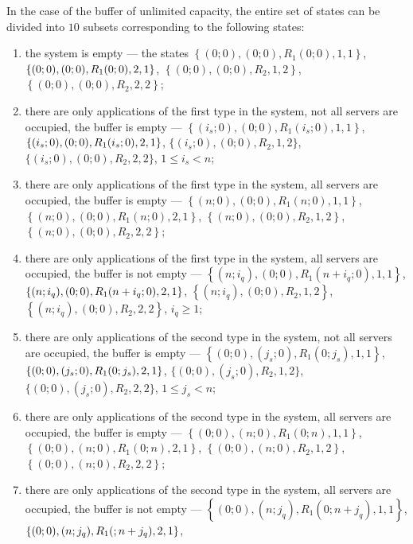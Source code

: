 {In the case of the buffer of unlimited capacity, the entire set of
states can be divided into $10$ subsets corresponding to the following
states:
\begin{enumerate}
\item the system is empty --- the
  states $\left\{(0; 0),(0; 0), R_1(0;0),1,1\right\}$,
  $\{(0; 0),(0; 0), R_1(0;0),\\* 2,1\}$,
  $\left\{(0; 0),(0; 0), R_2,1,2\right\}$,
  $\left\{(0; 0),(0; 0), R_2,2,2\right\}$;
\item there are only applications of the first type in the system, not
  all servers are occupied, the buffer is empty ---
  $\left\{(i_s; 0),(0; 0), R_1(i_s;0),1,1\right\}$,
  $\{(i_s; 0),(0; 0), R_1(i_s;0),\\* 2,1\}$,
  $\{(i_s; 0),(0; 0), R_2,1,2\}$, $\{(i_s; 0),(0; 0), R_2,2,2\}$,
  $1\leqslant  i_s < n$;
\item there are only applications of the first type in the system, all
  servers are occupied, the buffer is empty ---
  $\left\{(n; 0),(0; 0), R_1(n;0),1,1\right\}$,
  $\left\{(n; 0),(0; 0), R_1(n;0),2,1\right\}$,
  $\left\{(n; 0),(0; 0), R_2,1,2\right\}$,
  $\left\{(n; 0),(0; 0), R_2,2,2\right\}$;
\item there are only applications of the first type in the system, all
  servers are occupied, the buffer is not empty ---
  $\left\{(n; i_q),(0; 0), R_1(n+i_q;0),1,1\right\}$,
  $\{(n; i_q),(0; 0), \\*R_1(n+i_q;0),2,1\}$,
  $\left\{(n; i_q),(0; 0), R_2,1,2\right\}$,
  $\left\{(n; i_q),(0; 0), R_2,2,2\right\}$, $i_q\geqslant  1$;
\item there are only applications of the second type in the system,
  not all servers are occupied, the buffer is empty ---
  $\left\{(0; 0),(j_s; 0), R_1(0;j_s),1,1\right\}$,
  $\{(0; 0),(j_s; 0), R_1(0;j_s),\\* 2,1\}$,
  $\{(0; 0),(j_s; 0), R_2,1,2\}$, $\{(0; 0),(j_s; 0), R_2,2,2\}$,
  $1\leqslant  j_s <n$;
\item there are only applications of the second type in the system,
  all servers are occupied, the buffer is empty ---
  $\left\{(0; 0),(n; 0), R_1(0;n),1,1\right\}$,
  $\left\{(0; 0),(n; 0), R_1(0;n),2,1\right\}$,
  $\left\{(0; 0),(n; 0), R_2,1,2\right\}$,
  $\left\{(0; 0),(n; 0), R_2,2,2\right\}$;
\item there are only applications of the second type in the system,
  all servers are occupied, the buffer is not empty ---
  $\left\{(0; 0),(n; j_q), R_1(0;n+j_q),1,1\right\}$,
  $\{(0; 0),(n; j_q), \\*R_1(;n+j_q),2,1\}$,

\end{enumerate}}
